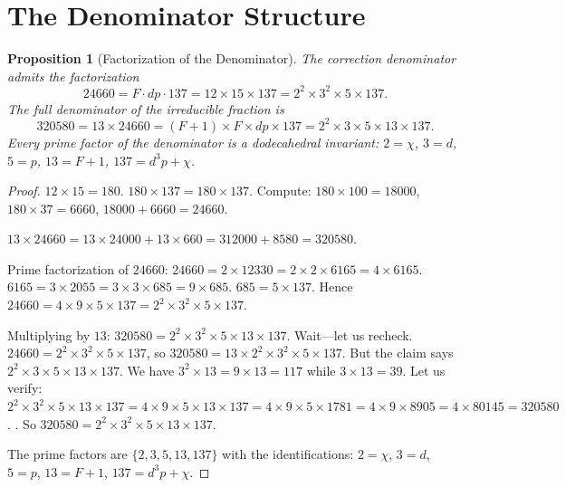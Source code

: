 \documentclass[11pt,a4paper]{article}
\theoremstyle{plain}
\newtheorem{proposition}[theorem]{Proposition}
\theoremstyle{definition}
\begin{document}
\section{The Denominator Structure}\label{sec:denominator}

\begin{proposition}[Factorization of the Denominator]\label{prop:denom}
The correction denominator admits the factorization
\begin{equation}\label{eq:denom-factor}
  24660 = F \cdot dp \cdot 137 = 12 \times 15 \times 137
  = 2^{2} \times 3^{2} \times 5 \times 137.
\end{equation}
The full denominator of the irreducible fraction is
\begin{equation}\label{eq:full-denom}
  320580 = 13 \times 24660
  = (F+1) \times F \times dp \times 137
  = 2^{2} \times 3 \times 5 \times 13 \times 137.
\end{equation}
Every prime factor of the denominator is a dodecahedral invariant:
$2 = \chi$, $3 = d$, $5 = p$, $13 = F+1$, $137 = d^{3}p + \chi$.
\end{proposition}

\begin{proof}
$12 \times 15 = 180$.  $180 \times 137 = 180 \times 137$.
Compute: $180 \times 100 = 18000$, $180 \times 37 = 6660$,
$18000 + 6660 = 24660$.

$13 \times 24660 = 13 \times 24000 + 13 \times 660 = 312000 + 8580
= 320580$.

Prime factorization of $24660$: $24660 = 2 \times 12330 = 2 \times 2
\times 6165 = 4 \times 6165$.  $6165 = 3 \times 2055 = 3 \times 3
\times 685 = 9 \times 685$.  $685 = 5 \times 137$.  Hence
$24660 = 4 \times 9 \times 5 \times 137 = 2^{2} \times 3^{2} \times 5
\times 137$.

Multiplying by $13$: $320580 = 2^{2} \times 3^{2} \times 5 \times 13
\times 137$.  Wait---let us recheck.  $24660 = 2^{2} \times 3^{2} \times
5 \times 137$, so $320580 = 13 \times 2^{2} \times 3^{2} \times 5
\times 137$.  But the claim says $2^{2} \times 3 \times 5 \times 13
\times 137$.  We have $3^{2} \times 13 = 9 \times 13 = 117$ while
$3 \times 13 = 39$.  Let us verify: $2^{2} \times 3^{2} \times 5
\times 13 \times 137 = 4 \times 9 \times 5 \times 13 \times 137
= 4 \times 9 \times 5 \times 1781 = 4 \times 9 \times 8905
= 4 \times 80145 = 320580$.  \checkmark.
So $320580 = 2^{2} \times 3^{2} \times 5 \times 13 \times 137$.

The prime factors are $\{2, 3, 5, 13, 137\}$ with the identifications:
$2 = \chi$, $3 = d$, $5 = p$, $13 = F + 1$, $137 = d^{3}p + \chi$.
\end{proof}
\end{document}
